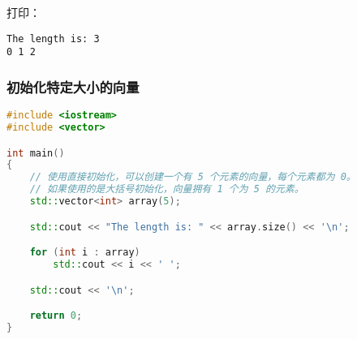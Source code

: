 \documentclass[../../LearnCpp.tex]{subfiles}
\begin{document}
打印：

\begin{lstlisting}
The length is: 3
0 1 2
\end{lstlisting}

\subsubsection*{初始化特定大小的向量}

\begin{lstlisting}[language=C++]
#include <iostream>
#include <vector>

int main()
{
    // 使用直接初始化，可以创建一个有 5 个元素的向量，每个元素都为 0。
    // 如果使用的是大括号初始化，向量拥有 1 个为 5 的元素。
    std::vector<int> array(5);

    std::cout << "The length is: " << array.size() << '\n';

    for (int i : array)
        std::cout << i << ' ';

    std::cout << '\n';

    return 0;
}
\end{lstlisting}
\end{document}
